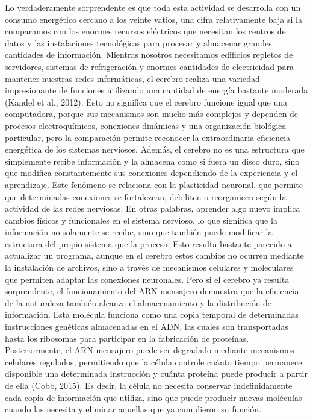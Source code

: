 \documentclass[12pt]{article}
\begin{document}
Lo verdaderamente sorprendente es que toda esta actividad se desarrolla con un consumo energético cercano a los veinte vatios, una cifra relativamente baja si la comparamos con los enormes recursos eléctricos que necesitan los centros de datos y las instalaciones tecnológicas para procesar y almacenar grandes cantidades de información. Mientras nosotros necesitamos edificios repletos de servidores, sistemas de refrigeración y enormes cantidades de electricidad para mantener nuestras redes informáticas, el cerebro realiza una variedad impresionante de funciones utilizando una cantidad de energía bastante moderada (Kandel et al., 2012). Esto no significa que el cerebro funcione igual que una computadora, porque sus mecanismos son mucho más complejos y dependen de procesos electroquímicos, conexiones dinámicas y una organización biológica particular, pero la comparación permite reconocer la extraordinaria eficiencia energética de los sistemas nerviosos.
Además, el cerebro no es una estructura que simplemente recibe información y la almacena como si fuera un disco duro, sino que modifica constantemente sus conexiones dependiendo de la experiencia y el aprendizaje. Este fenómeno se relaciona con la plasticidad neuronal, que permite que determinadas conexiones se fortalezcan, debiliten o reorganicen según la actividad de las redes nerviosas. En otras palabras, aprender algo nuevo implica cambios físicos y funcionales en el sistema nervioso, lo que significa que la información no solamente se recibe, sino que también puede modificar la estructura del propio sistema que la procesa. Esto resulta bastante parecido a actualizar un programa, aunque en el cerebro estos cambios no ocurren mediante la instalación de archivos, sino a través de mecanismos celulares y moleculares que permiten adaptar las conexiones neuronales.
Pero si el cerebro ya resulta sorprendente, el funcionamiento del ARN mensajero demuestra que la eficiencia de la naturaleza también alcanza el almacenamiento y la distribución de información. Esta molécula funciona como una copia temporal de determinadas instrucciones genéticas almacenadas en el ADN, las cuales son transportadas hasta los ribosomas para participar en la fabricación de proteínas. Posteriormente, el ARN mensajero puede ser degradado mediante mecanismos celulares regulados, permitiendo que la célula controle cuánto tiempo permanece disponible una determinada instrucción y cuánta proteína puede producir a partir de ella (Cobb, 2015). Es decir, la célula no necesita conservar indefinidamente cada copia de información que utiliza, sino que puede producir nuevas moléculas cuando las necesita y eliminar aquellas que ya cumplieron su función.
\end{document}
